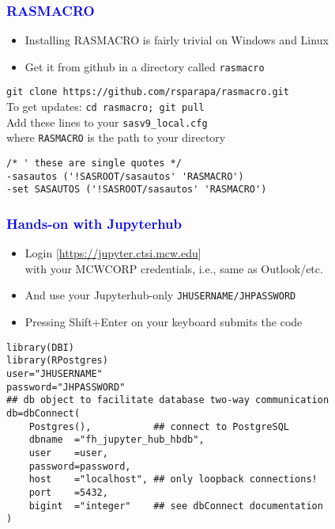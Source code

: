 \documentclass[11pt,pdftex,dvipsnames,usenames]{beamer}
\begin{document}
\begin{frame}[fragile]\frametitle{\bf\textcolor{blue}{RASMACRO}}
\begin{itemize}
\item Installing RASMACRO is fairly trivial on Windows and Linux
\item Get it from github in a directory called \texttt{rasmacro}
\end{itemize}
\texttt{git clone https://github.com/rsparapa/rasmacro.git} \\
To get updates: \texttt{cd rasmacro; git pull} \\
Add these lines to your \texttt{sasv9\_local.cfg} \\
where \texttt{RASMACRO} is the path to your directory 
\begin{verbatim}
/* ' these are single quotes */
-sasautos ('!SASROOT/sasautos' 'RASMACRO') 
-set SASAUTOS ('!SASROOT/sasautos' 'RASMACRO')
\end{verbatim}
\end{frame}

\begin{frame}[fragile]\frametitle{\bf\textcolor{blue}{Hands-on with Jupyterhub}}
\begin{itemize}
\item Login \textcolor{PineGreen}{[\href{https://jupyter.ctsi.mcw.edu}{https://jupyter.ctsi.mcw.edu}]} \\
with your MCWCORP credentials, i.e., same as Outlook/etc.
\item And use your Jupyterhub-only \texttt{JHUSERNAME/JHPASSWORD}
\item Pressing Shift+Enter on your keyboard submits the code
\end{itemize}
\begin{verbatim}
library(DBI)
library(RPostgres)
user="JHUSERNAME" 
password="JHPASSWORD"
## db object to facilitate database two-way communication
db=dbConnect(
    Postgres(),           ## connect to PostgreSQL
    dbname  ="fh_jupyter_hub_hbdb",
    user    =user,
    password=password,
    host    ="localhost", ## only loopback connections! 
    port    =5432, 
    bigint  ="integer"    ## see dbConnect documentation
)
\end{verbatim}
\end{frame}
\end{document}
